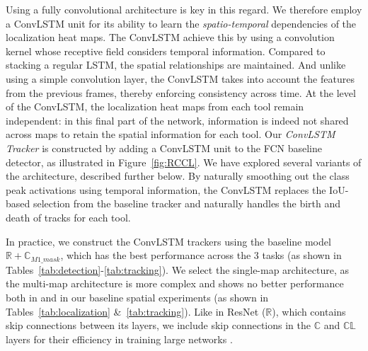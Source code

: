 \documentclass{svjour3}                     \smartqed
\begin{document}
Using a fully convolutional architecture is key in this regard. We therefore employ a ConvLSTM unit for its ability to learn the \emph{spatio-temporal} dependencies of the localization heat maps. The ConvLSTM achieve this by using a convolution kernel whose receptive field considers temporal information. Compared to stacking a regular LSTM, the spatial relationships are maintained.  And unlike using a simple convolution layer, the ConvLSTM takes into account the features from the previous frames, thereby enforcing consistency across time. At the level of the ConvLSTM, the localization heat maps from each tool remain independent: in this final part of the network, information is indeed not shared across maps to retain the spatial information for each tool. Our \emph{ConvLSTM Tracker} is constructed by adding a ConvLSTM unit to the FCN baseline detector, as illustrated in Figure~\ref{fig:RCCL}. We have explored several variants of the architecture, described further below. 
By naturally smoothing out the class peak activations using temporal information, the ConvLSTM replaces the IoU-based selection from the baseline tracker and naturally handles the birth and death of tracks for each tool. 

In practice, we construct the ConvLSTM trackers using the baseline model $\mathbb{R+C}_{M1\_mask}$, which has the best performance across the 3 tasks (as shown in Tables~\ref{tab:detection}-\ref{tab:tracking}). We select the single-map architecture, as the multi-map architecture is more complex and shows no better performance both in \cite{miccai:vardazaryan2018weakly} and in our baseline spatial experiments (as shown in Tables~\ref{tab:localization} \&~\ref{tab:tracking}). 
Like in ResNet ($\mathbb{R}$), which contains skip connections between its layers, we include skip connections in the $\mathbb{C}$ and $\mathbb{CL}$ layers for their efficiency in training large networks \cite{cvpr:he2016deep,iwwwcsw:wei2018residual}.
\end{document}
